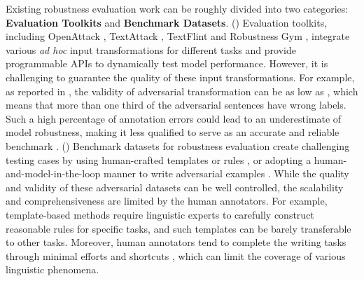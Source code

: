 \documentclass{article}
\begin{document}
Existing robustness evaluation work can be roughly divided into two categories:  \textbf{Evaluation Toolkits} and \textbf{Benchmark Datasets}. 
() Evaluation toolkits, including OpenAttack \citep{openattack}, TextAttack \citep{textattack}, TextFlint \citep{textflint} and Robustness Gym \citep{robustnessgym}, integrate various \textit{ad hoc} input transformations for different tasks and provide programmable APIs to dynamically test model performance. 
However, it is challenging to guarantee the quality of these input transformations. 
For example, as reported in \citep{comattack}, the validity of adversarial transformation can be as low as , which means that more than one third of the adversarial sentences have wrong labels.
Such a high percentage of annotation errors could lead to an underestimate of model robustness, making it less qualified to serve as an accurate and reliable benchmark \citep{criteria}. 
() Benchmark datasets for robustness evaluation create challenging testing cases by using human-crafted templates or rules \citep{advfever,checklist,stresstest}, or adopting a human-and-model-in-the-loop manner to write adversarial examples \citep{anli,dynabench,dynabenchqa}. 
While the quality and validity of these adversarial datasets can be well controlled, the scalability and comprehensiveness are limited by the human annotators. 
For example, template-based methods require linguistic experts to carefully construct reasonable rules for specific tasks, and such templates can be barely transferable to other tasks. 
Moreover, human annotators tend to complete the writing tasks through minimal efforts and shortcuts \citep{burghardt2020origins,wall2021left}, which can limit the coverage of various linguistic phenomena. 
\end{document}
